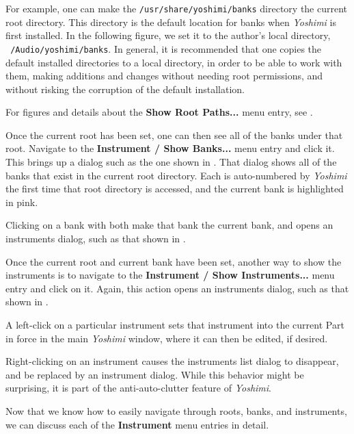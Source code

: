    For example, one can make the \texttt{/usr/share/yoshimi/banks} directory
   the current root directory.  This directory is the default location for
   banks when \textsl{Yoshimi} is first installed.
   In the following figure, we set it to the author's local directory,
   \texttt{~/Audio/yoshimi/banks}.
   In general, it is recommended that one copies the default installed
   directories to a local directory, in order to be able to work with them,
   making additions and changes without needing root permissions, and
   without risking the corruption of the default installation.

   For figures and details about the \textbf{Show Root Paths...} menu entry,
   see .

   Once the current root has been set, one can then see all of the banks
   under that root.  Navigate to the \textbf{Instrument / Show Banks...} menu
   entry and click it.  This brings up a dialog such as the one shown in
   .  That dialog shows all of the banks that
   exist in the current root directory.  Each is auto-numbered by
   \textsl{Yoshimi} the first time that root directory is accessed, and the
   current bank is highlighted in pink.

   Clicking on a bank with both make that bank the current bank, and opens an
   instruments dialog, such as that shown in
   .

   Once the current root and current bank have been set, another way to show
   the instruments is to navigate to the
   \textbf{Instrument / Show Instruments...} menu entry and click on it.
   Again, this action opens an instruments dialog, such as that shown in
   .

   A left-click on a particular instrument sets that instrument into the
   current Part in force in the main \textsl{Yoshimi} window, where it can
   then be edited, if desired.

   Right-clicking on an instrument causes the instruments list dialog
   to disappear, and be replaced by an instrument dialog.  While this
   behavior might be surprising, it is part of the anti-auto-clutter feature
   of \textsl{Yoshimi}.

   Now that we know how to easily navigate through roots, banks, and
   instruments, we can discuss each of the \textbf{Instrument} menu entries
   in detail.

